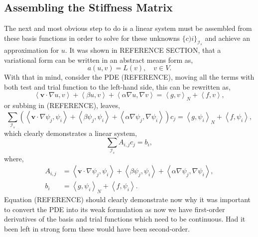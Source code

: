 \subsection{Assembling the Stiffness Matrix}

The next and most obvious step to do is a linear system must be assembled from these basis functions in order to solve for these unknowns $\{c)i\}_{\mathcal{I}_s}$ and achieve an approximation for $u$. It was shown in REFERENCE SECTION, that a variational form can be written in an abstract means form as,
\begin{equation}
	a(u,v) = L(v),\quad v\in V.
\end{equation}
With that in mind, consider the PDE (REFERENCE), moving all the terms with both test and trial function to the left-hand side, this can be rewritten as,
\begin{equation}
	\left\langle\mathbf{v}\cdot\nabla u,v\right\rangle + \left\langle\beta u,v\right\rangle + \left\langle\alpha\nabla u, \nabla v\right\rangle = \left\langle g,v\right\rangle_N + \left\langle f,v\right\rangle,
\end{equation}
or subbing in (REFERENCE), leaves,
\begin{equation}
	\sum_{\mathcal{I}_s}\left(\left\langle\mathbf{v}\cdot\nabla \psi_j,\psi_i\right\rangle + \left\langle\beta \psi_j,\psi_i\right\rangle + \left\langle\alpha\nabla \psi_j, \nabla \psi_i\right\rangle\right)c_j = \left\langle g,\psi_i\right\rangle_N + \left\langle f,\psi_i\right\rangle,
\end{equation}
which clearly demonstrates a linear system,
\begin{equation}
	\sum_{\mathcal{I}_s} A_{i,j}c_j = b_i,
\end{equation}
where,
\begin{align}
	A_{i,j} &= \left\langle\mathbf{v}\cdot\nabla \psi_j,\psi_i\right\rangle + \left\langle\beta \psi_j,\psi_i\right\rangle + \left\langle\alpha\nabla \psi_j, \nabla \psi_i\right\rangle,\\
	b_i &= \left\langle g,\psi_i\right\rangle_N + \left\langle f,\psi_i\right\rangle.
\end{align}
Equation (REFERENCE) should clearly demonstrate now why it was important to convert the PDE into its weak formulation as now we have first-order derivatives of the basis and trial functions which need to be continuous. Had it been left in strong form these would have been second-order.

